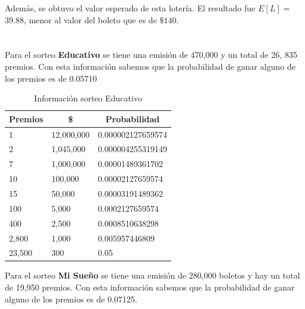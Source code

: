 Además, se obtuvo el valor esperado de esta lotería. El resultado fue $E[L] =$ 39.88, menor al valor del boleto que es de $\$ 140$. \\ \\\\

Para el sorteo \textbf{Educativo} se tiene una emisión de 470,000 y un total de 26, 835 premios. Con esta información sabemos que la probabilidad de ganar alguno de los premios es de 0.05710

\begin{table}[H]
\centering
\caption{Información sorteo Educativo}
\label{tab:educ}
\begin{tabular}{@{}lll@{}}
\toprule
\multicolumn{1}{c}{Premios} & \multicolumn{1}{c}{\$} & \multicolumn{1}{c}{Probabilidad} \\ \midrule
1                           & 12,000,000               & 0.000002127659574                \\
2                           & 1,045,000                & 0.000004255319149                \\
7                           & 1,000,000                & 0.00001489361702                 \\
10                          & 100,000                 & 0.00002127659574                 \\
15                          & 50,000                  & 0.00003191489362                 \\
100                         & 5,000                   & 0.0002127659574                  \\
400                         & 2,500                   & 0.0008510638298                  \\
2,800                        & 1,000                   & 0.005957446809                   \\
23,500                       & 300                    & 0.05                             \\ \bottomrule
\end{tabular}
\end{table}

\newpage
Para el sorteo \textbf{Mi Sueño} se tiene una emisión de 280,000 boletos y hay un total de 19,950 premios. Con esta información sabemos que la probabilidad de ganar alguno de los premios es de 0.07125. 

